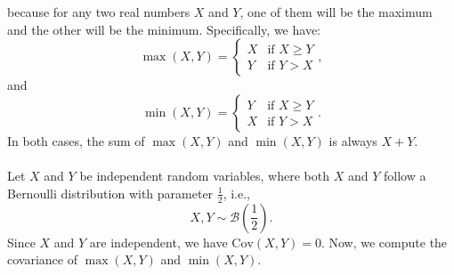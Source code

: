 \documentclass[a4paper,11pt]{article}
\begin{document}
\\ \\
 because for any two real numbers \(X\) and \(Y\), one of them will be the maximum and the other will be the minimum. Specifically, we have:
\[
\max(X, Y) = \begin{cases}
X & \text{if } X \geq Y \\
Y & \text{if } Y > X
\end{cases},
\]
and
\[
\min(X, Y) = \begin{cases}
Y & \text{if } X \geq Y \\
X & \text{if } Y > X
\end{cases}.
\]
In both cases, the sum of \(\max(X, Y)\) and \(\min(X, Y)\) is always \(X + Y\).
\\ \\
Let \(X\) and \(Y\) be independent random variables, where both \(X\) and \(Y\) follow a Bernoulli distribution with parameter \(\displaystyle \frac{1}{2}\), i.e.,
\[
X, Y \sim \mathcal{B}\left(\frac{1}{2}\right).
\]
Since $X$ and $Y$ are independent, we have $\text{Cov}(X, Y) = 0$. Now, we compute the covariance of \(\max(X, Y)\) and \(\min(X, Y)\).
\end{document}
